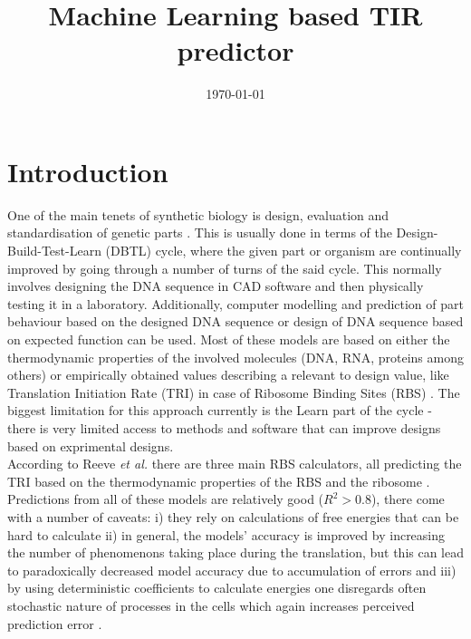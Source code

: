 \documentclass{article}
\title{Machine Learning based TIR predictor}
\author{}
\date{\today{}}
\begin{document}
\maketitle

\section{Introduction}

One of the main tenets of synthetic biology is design, evaluation and standardisation of genetic parts \cite{Brophy2014,Canton2008,Stanton2014}. This is usually done in terms of the Design-Build-Test-Learn (DBTL) cycle, where the given part or organism are continually improved by going through a number of turns of the said cycle. This normally involves designing the DNA sequence in CAD software and then physically testing it in a laboratory. Additionally, computer modelling and prediction of part behaviour based on the designed DNA sequence or design of DNA sequence based on expected function can be used\cite{Yeoh2019,Nielsen2016}. Most of these models are based on either the thermodynamic properties of the involved molecules (DNA, RNA, proteins among others) or empirically obtained values describing a relevant to design value, like Translation Initiation Rate (TRI) in case of Ribosome Binding Sites (RBS) \cite{Xia1998,Chen2013,Reeve2014}. The biggest limitation for this approach currently is the Learn part of the cycle - there is very limited access to methods and software that can improve designs based on exprimental designs.\\
According to Reeve \emph{et al.} there are three main RBS calculators, all predicting the TRI based on the thermodynamic properties of the RBS and the ribosome \cite{Seo2013,Na2010,Salis2009}. Predictions from all of these models are relatively good ($R^2 >0.8$), there come with a number of caveats: i) they rely on calculations of free energies that can be hard to calculate ii) in general, the models' accuracy is improved by increasing the number of phenomenons taking place during the translation, but this can lead to paradoxically decreased model accuracy due to accumulation of errors \cite{EspahBorujeni2016} and iii) by using deterministic coefficients to calculate energies one disregards often stochastic nature of processes in the cells which again increases perceived prediction error \cite{Goss1998}. \\
\end{document}
